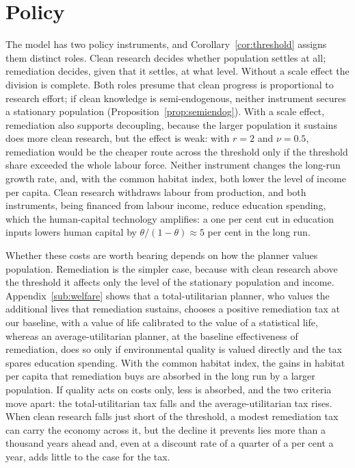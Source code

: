 \documentclass[11pt]{article}
\begin{document}
\section{Policy}
\label{sec:policy}

The model has two policy instruments, and Corollary~\ref{cor:threshold} assigns them distinct roles.
Clean research decides whether population settles at all; remediation decides, given that it settles, at
what level. Without a scale effect the division is complete. Both roles presume that clean progress is
proportional to research effort; if clean knowledge is semi-endogenous, neither instrument secures a
stationary population (Proposition~\ref{prop:semiendog}). With a scale effect, remediation also supports
decoupling, because the larger population it sustains does more clean research, but the effect is
weak: with $r=2$ and $\nu=0.5$, remediation would be the cheaper route across the threshold only if the
threshold share exceeded the whole labour force. Neither instrument changes the long-run growth rate,
and, with the common habitat index, both lower the level of income per capita. Clean research withdraws labour from production, and
both instruments, being financed from labour income, reduce education spending, which the
human-capital technology amplifies: a one per cent cut in education inputs lowers human capital by
$\theta/(1-\theta)\approx5$ per cent in the long run.

Whether these costs are worth bearing depends on how the planner values population. Remediation is the
simpler case, because with clean research above the threshold it affects only the level of the
stationary population and income. Appendix~\ref{sub:welfare} shows that a total-utilitarian
planner, who values the additional lives that remediation sustains, chooses a positive remediation tax at
our baseline, with a value of life calibrated to the value of a statistical life, whereas an
average-utilitarian planner, at the baseline effectiveness of remediation, does so only if environmental
quality is valued directly and the tax spares education spending. With the common
habitat index, the gains in habitat per capita that remediation buys are absorbed in the long run by a
larger population. If quality acts on costs only, less is absorbed, and the two criteria move apart: the
total-utilitarian tax falls and the average-utilitarian tax rises. When clean
research falls just short of the threshold, a modest remediation tax can carry the economy across it, but
the decline it prevents lies more than a thousand years ahead and, even at a discount rate of a quarter of a
per cent a year, adds little to the case for the tax.
\end{document}

